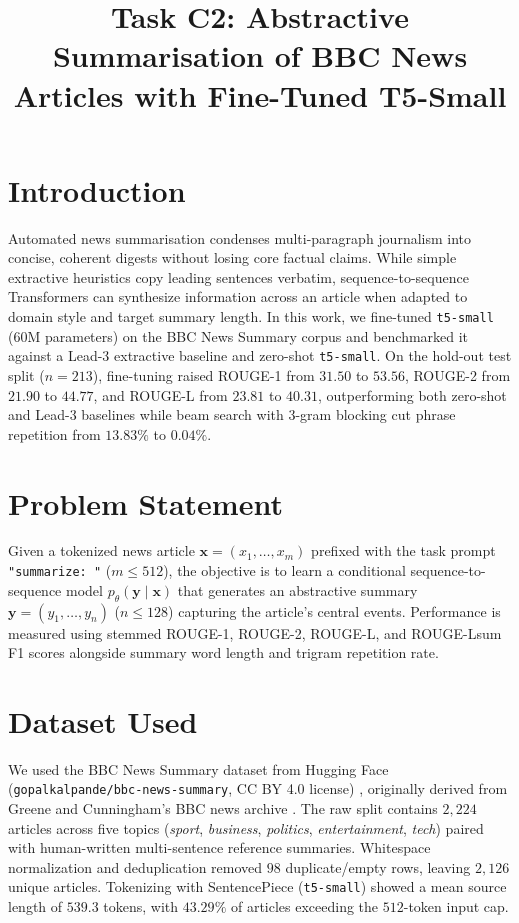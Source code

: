 \documentclass[conference,a4paper]{IEEEtran}
\title{Task C2: Abstractive Summarisation of BBC News Articles with Fine-Tuned T5-Small}
\author{
\IEEEauthorblockN{Aliaan Shams \quad Roll No. 70177202 \quad Section C}
\IEEEauthorblockA{Department of Intelligent Systems, The University of Lahore (AI-101) \\
Repository: \url{https://github.com/Aliaan-70177202/AI101-ML-Assignment-70177202} \\
Instructor: Dr. Muhammad Awais, AI Architect}
}
\begin{document}
\maketitle

\section{Introduction}
Automated news summarisation condenses multi-paragraph journalism into concise, coherent digests without losing core factual claims. While simple extractive heuristics copy leading sentences verbatim, sequence-to-sequence Transformers can synthesize information across an article when adapted to domain style and target summary length. In this work, we fine-tuned \texttt{t5-small} (60M parameters) on the BBC News Summary corpus and benchmarked it against a Lead-3 extractive baseline and zero-shot \texttt{t5-small}. On the hold-out test split ($n = 213$), fine-tuning raised ROUGE-1 from $31.50$ to $53.56$, ROUGE-2 from $21.90$ to $44.77$, and ROUGE-L from $23.81$ to $40.31$, outperforming both zero-shot and Lead-3 baselines while beam search with 3-gram blocking cut phrase repetition from $13.83\%$ to $0.04\%$.

\section{Problem Statement}
Given a tokenized news article $\mathbf{x} = (x_1, \dots, x_m)$ prefixed with the task prompt \texttt{"summarize: "} ($m \le 512$), the objective is to learn a conditional sequence-to-sequence model $p_\theta(\mathbf{y} \mid \mathbf{x})$ that generates an abstractive summary $\mathbf{y} = (y_1, \dots, y_n)$ ($n \le 128$) capturing the article's central events. Performance is measured using stemmed ROUGE-1, ROUGE-2, ROUGE-L, and ROUGE-Lsum F1 scores alongside summary word length and trigram repetition rate.

\section{Dataset Used}
We used the BBC News Summary dataset from Hugging Face (\texttt{gopalkalpande/bbc-news-summary}, CC BY 4.0 license) \cite{bbc_ds}, originally derived from Greene and Cunningham's BBC news archive \cite{greene06}. The raw split contains $2,224$ articles across five topics (\textit{sport}, \textit{business}, \textit{politics}, \textit{entertainment}, \textit{tech}) paired with human-written multi-sentence reference summaries. Whitespace normalization and deduplication removed $98$ duplicate/empty rows, leaving $2,126$ unique articles. Tokenizing with SentencePiece (\texttt{t5-small}) showed a mean source length of $539.3$ tokens, with $43.29\%$ of articles exceeding the $512$-token input cap.
\end{document}
